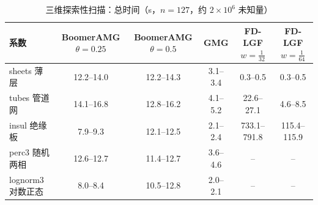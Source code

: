 \begin{table}[H]\centering\small
\caption{三维探索性扫描：总时间（s，$n=127$，约 $2\times10^6$ 未知量）}\label{tab:s3time}
\begin{tabular}{lccccc}
\toprule
系数 & BoomerAMG $\theta{=}0.25$ & BoomerAMG $\theta{=}0.5$ & GMG & FD-LGF $w{=}\frac1{32}$ & FD-LGF $w{=}\frac1{64}$ \\
\midrule
sheets 薄层 & 12.2--14.0 & 12.2--14.3 & 3.1--3.4 & 0.3--0.5 & 0.3--0.5 \\
tubes 管道网 & 14.1--16.8 & 12.8--16.2 & 4.1--5.2 & 22.6--27.1 & 4.6--8.5 \\
insul 绝缘板 & 7.9--9.3 & 12.1--12.5 & 2.1--2.4 & 733.1--791.8 & 115.4--115.9 \\
perc3 随机两相 & 12.6--12.7 & 11.4--12.7 & 3.6--4.6 & -- & -- \\
lognorm3 对数正态 & 8.0--8.4 & 10.5--12.8 & 2.0--2.1 & -- & -- \\
\bottomrule
\end{tabular}
\end{table}